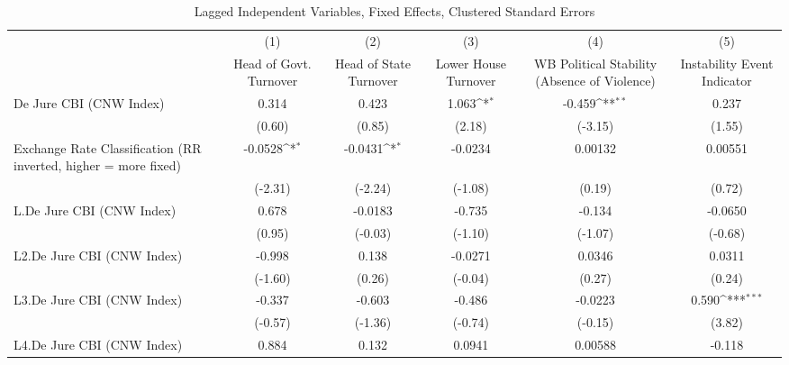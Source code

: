 {
\def\sym#1{\ifmmode^{#1}\else\(^{#1}\)\fi}
\begin{longtable}{l*{5}{c}}
\caption{Lagged Independent Variables, Fixed Effects, Clustered Standard Errors \label{lagsDJ}}\\
\hline\hline\endfirsthead\hline\endhead\hline\endfoot\endlastfoot
                &\multicolumn{1}{c}{(1)}&\multicolumn{1}{c}{(2)}&\multicolumn{1}{c}{(3)}&\multicolumn{1}{c}{(4)}&\multicolumn{1}{c}{(5)}\\
                &\multicolumn{1}{c}{Head of Govt. Turnover}&\multicolumn{1}{c}{Head of State Turnover}&\multicolumn{1}{c}{Lower House Turnover}&\multicolumn{1}{c}{WB Political Stability (Absence of Violence)}&\multicolumn{1}{c}{Instability Event Indicator}\\
\hline
De Jure CBI (CNW Index)&    0.314         &    0.423         &    1.063\sym{*}  &   -0.459\sym{**} &    0.237         \\
                &   (0.60)         &   (0.85)         &   (2.18)         &  (-3.15)         &   (1.55)         \\
[1em]
Exchange Rate Classification (RR inverted, higher = more fixed)&  -0.0528\sym{*}  &  -0.0431\sym{*}  &  -0.0234         &  0.00132         &  0.00551         \\
                &  (-2.31)         &  (-2.24)         &  (-1.08)         &   (0.19)         &   (0.72)         \\
[1em]
L.De Jure CBI (CNW Index)&    0.678         &  -0.0183         &   -0.735         &   -0.134         &  -0.0650         \\
                &   (0.95)         &  (-0.03)         &  (-1.10)         &  (-1.07)         &  (-0.68)         \\
[1em]
L2.De Jure CBI (CNW Index)&   -0.998         &    0.138         &  -0.0271         &   0.0346         &   0.0311         \\
                &  (-1.60)         &   (0.26)         &  (-0.04)         &   (0.27)         &   (0.24)         \\
[1em]
L3.De Jure CBI (CNW Index)&   -0.337         &   -0.603         &   -0.486         &  -0.0223         &    0.590\sym{***}\\
                &  (-0.57)         &  (-1.36)         &  (-0.74)         &  (-0.15)         &   (3.82)         \\
[1em]
L4.De Jure CBI (CNW Index)&    0.884         &    0.132         &   0.0941         &  0.00588         &   -0.118         \\

\end{longtable}}
